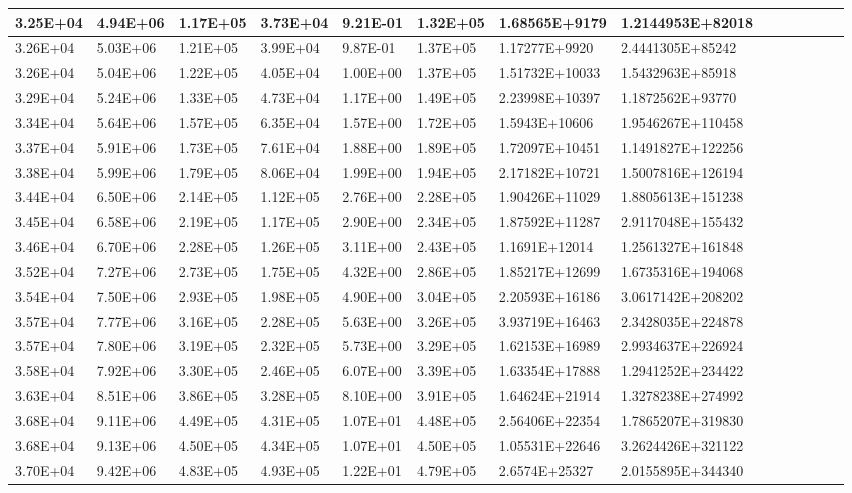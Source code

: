 \documentclass{article}
\begin{document}
\begin{itemize}
\begin{table}[H]
{\begin{tabular}{|l|l|l|l|l|l|l|l|l|l|l|l|l|l|}
    \hline
    3.25E+04 & 4.94E+06 & 1.17E+05 & 3.73E+04 & 9.21E-01 & 1.32E+05 & 1.68565E+9179 & 1.2144953E+82018 \\
    \hline
    3.26E+04 & 5.03E+06 & 1.21E+05 & 3.99E+04 & 9.87E-01 & 1.37E+05 & 1.17277E+9920 & 2.4441305E+85242 \\
    \hline
    3.26E+04 & 5.04E+06 & 1.22E+05 & 4.05E+04 & 1.00E+00 & 1.37E+05 & 1.51732E+10033 & 1.5432963E+85918 \\
    \hline
    3.29E+04 & 5.24E+06 & 1.33E+05 & 4.73E+04 & 1.17E+00 & 1.49E+05 & 2.23998E+10397 & 1.1872562E+93770 \\
    \hline
    3.34E+04 & 5.64E+06 & 1.57E+05 & 6.35E+04 & 1.57E+00 & 1.72E+05 & 1.5943E+10606 & 1.9546267E+110458 \\
    \hline
    3.37E+04 & 5.91E+06 & 1.73E+05 & 7.61E+04 & 1.88E+00 & 1.89E+05 & 1.72097E+10451 & 1.1491827E+122256 \\
    \hline
    3.38E+04 & 5.99E+06 & 1.79E+05 & 8.06E+04 & 1.99E+00 & 1.94E+05 & 2.17182E+10721 & 1.5007816E+126194 \\
    \hline
    3.44E+04 & 6.50E+06 & 2.14E+05 & 1.12E+05 & 2.76E+00 & 2.28E+05 & 1.90426E+11029 & 1.8805613E+151238 \\
    \hline
    3.45E+04 & 6.58E+06 & 2.19E+05 & 1.17E+05 & 2.90E+00 & 2.34E+05 & 1.87592E+11287 & 2.9117048E+155432 \\
    \hline
    3.46E+04 & 6.70E+06 & 2.28E+05 & 1.26E+05 & 3.11E+00 & 2.43E+05 & 1.1691E+12014 & 1.2561327E+161848 \\
    \hline
    3.52E+04 & 7.27E+06 & 2.73E+05 & 1.75E+05 & 4.32E+00 & 2.86E+05 & 1.85217E+12699 & 1.6735316E+194068 \\
    \hline
    3.54E+04 & 7.50E+06 & 2.93E+05 & 1.98E+05 & 4.90E+00 & 3.04E+05 & 2.20593E+16186 & 3.0617142E+208202 \\
    \hline
    3.57E+04 & 7.77E+06 & 3.16E+05 & 2.28E+05 & 5.63E+00 & 3.26E+05 & 3.93719E+16463 & 2.3428035E+224878 \\
    \hline
    3.57E+04 & 7.80E+06 & 3.19E+05 & 2.32E+05 & 5.73E+00 & 3.29E+05 & 1.62153E+16989 & 2.9934637E+226924 \\
    \hline
    3.58E+04 & 7.92E+06 & 3.30E+05 & 2.46E+05 & 6.07E+00 & 3.39E+05 & 1.63354E+17888 & 1.2941252E+234422 \\
    \hline
    3.63E+04 & 8.51E+06 & 3.86E+05 & 3.28E+05 & 8.10E+00 & 3.91E+05 & 1.64624E+21914 & 1.3278238E+274992 \\
    \hline
    3.68E+04 & 9.11E+06 & 4.49E+05 & 4.31E+05 & 1.07E+01 & 4.48E+05 & 2.56406E+22354 & 1.7865207E+319830 \\
    \hline
    3.68E+04 & 9.13E+06 & 4.50E+05 & 4.34E+05 & 1.07E+01 & 4.50E+05 & 1.05531E+22646 & 3.2624426E+321122 \\
    \hline
    3.70E+04 & 9.42E+06 & 4.83E+05 & 4.93E+05 & 1.22E+01 & 4.79E+05 & 2.6574E+25327 & 2.0155895E+344340 \\
\hline
\bottomrule
\end{tabular}}
\end{table}


\end{itemize}
\end{document}
